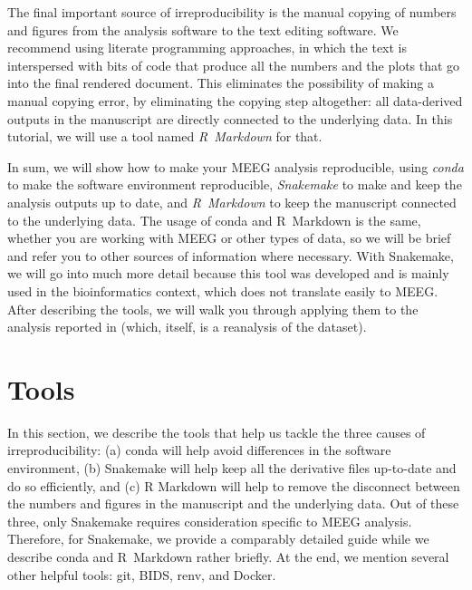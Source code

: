 \documentclass[a4paper,man,floatsintext,natbib]{apa6}
\begin{document}
The final important source of irreproducibility is the manual copying of numbers and figures from the analysis software to the text editing software. We recommend using literate programming approaches, in which the text is interspersed with bits of code that produce all the numbers and the plots that go into the final rendered document. This eliminates the possibility of making a manual copying error, by eliminating the copying step altogether: all data-derived outputs in the manuscript are directly connected to the underlying data. In this tutorial, we will use a tool named \emph{R~Markdown} for that.

In sum, we will show how to make your MEEG analysis reproducible, using \emph{conda} to make the software environment reproducible, \emph{Snakemake} to make and keep the analysis outputs up to date, and \emph{R~Markdown} to keep the manuscript connected to the underlying data. The usage of conda and R~Markdown is the same, whether you are working with MEEG or other types of data, so we will be brief and refer you to other sources of information where necessary. With Snakemake, we will go into much more detail because this tool was developed and is mainly used in the bioinformatics context, which does not translate easily to MEEG. After describing the tools, we will walk you through applying them to the analysis reported in \cite{jasReproducibleMEGEEG2018a} (which, itself, is a reanalysis of the \cite{wakemanMultisubjectMultimodalHuman2015} dataset).

\section{Tools}
In this section, we describe the tools that help us tackle the three causes of irreproducibility: (a) conda will help avoid differences in the software environment, (b) Snakemake will help keep all the derivative files up-to-date and do so efficiently, and (c) R Markdown will help to remove the disconnect between the numbers and figures in the manuscript and the underlying data. 
Out of these three, only Snakemake requires consideration specific to MEEG analysis.
Therefore, for Snakemake, we provide a comparably detailed guide while we describe conda and R~Markdown rather briefly.
At the end, we mention several other helpful tools: git, BIDS, renv, and Docker.
\end{document}
